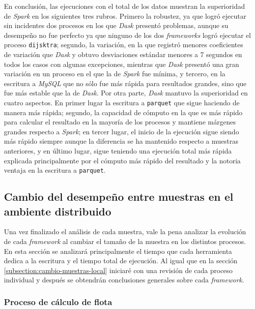 En conclusión, las ejecuciones con el total de los datos muestran la superioridad de \textit{Spark} en los siguientes tres rubros. Primero la robustez, ya que logró ejecutar sin incidentes dos procesos en los que \textit{Dask} presentó problemas, aunque su desempeño no fue perfecto ya que ninguno de los dos \textit{frameworks} logró ejecutar el proceso \texttt{dijsktra}; segundo, la variación, en la que registró menores coeficientes de variación que \textit{Dask} y obtuvo desviaciones estándar menores a 7 segundos en todos los casos con algunas excepciones, mientras que \textit{Dask} presentó una gran variación en un proceso en el que la de \textit{Spark} fue mínima, y tercero, en la escritura a \textit{MySQL} que no sólo fue más rápida para resultados grandes, sino que fue más estable que la de \textit{Dask}. Por otra parte, \textit{Dask} mantuvo la superioridad en cuatro aspectos. En primer lugar la escritura a \texttt{parquet} que sigue haciendo de manera más rápida; segundo, la capacidad de cómputo en la que es más rápido para calcular el resultado en la mayoría de los procesos y mantiene márgenes grandes respecto a \textit{Spark}; en tercer lugar, el inicio de la ejecución sigue siendo más rápido siempre aunque la diferencia se ha mantenido respecto a muestras anteriores, y en último lugar, sigue teniendo una ejecución total más rápida explicada principalmente por el cómputo más rápido del resultado y la notoria ventaja en la escritura a \texttt{parquet}.



\subsection{Cambio del desempeño entre muestras en el ambiente distribuido}

Una vez finalizado el análisis de cada muestra, vale la pena analizar la evolución de cada \textit{framework} al cambiar el tamaño de la muestra en los distintos procesos. En esta sección se analizará principalmente el tiempo que cada herramienta dedica a la escritura y el tiempo total de ejecución. Al igual que en la sección \ref{subsection:cambio-muestras-local} iniciaré con una revisión de cada proceso individual y después se obtendrán conclusiones generales sobre cada \textit{framework}.

\subsubsection{Proceso de cálculo de flota}

